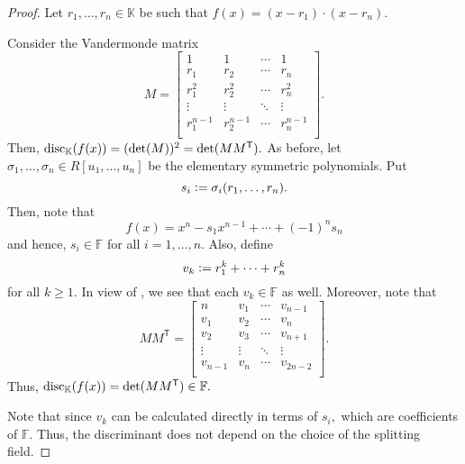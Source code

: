 \independencediscriminant*\label{prop:independencediscriminant2}
\begin{flushright}\hyperref[prop:independencediscriminant]{\upsym}\end{flushright}
\begin{proof}
    Let $r_1, \ldots, r_n \in \mathbb{K}$ be such that $f(x) = (x - r_1) \cdot (x - r_n).$

    Consider the Vandermonde matrix
    \begin{equation*} 
        M = \begin{bmatrix}
            1 & 1 & \cdots & 1\\
            r_1 & r_2 & \cdots & r_n\\
            r_1^2 & r_2^2 & \cdots & r_n^2\\
            \vdots & \vdots & \ddots & \vdots \\
            r_1^{n - 1} & r_2^{n - 1} & \cdots & r_n^{n - 1}\\
        \end{bmatrix}.
    \end{equation*}
    Then, $\operatorname{disc}_{\mathbb{K}}(f(x)) = (\det(M))^2 = \det(MM^{\mathsf{T}}).$ As before, let $\sigma_1, \ldots, \sigma_n \in R[u_1, \ldots, u_n]$ be the elementary symmetric polynomials. Put
    \begin{equation*} 
        s_i \vcentcolon= \sigma_i(r_1, \ldots, r_n).
    \end{equation*}
    Then, note that
    \begin{equation*} 
        f(x) = x^n - s_1x^{n - 1} + \cdots + (-1)^ns_n
    \end{equation*}
    and hence, $s_i \in \mathbb{F}$ for all $i = 1, \ldots, n.$ Also, define
    \begin{equation*} 
        v_k \vcentcolon= r_1^k + \cdots + r_n^k
    \end{equation*}
    for all $k \ge 1.$ In view of , we see that each $v_k \in \mathbb{F}$ as well. Moreover, note that
    \begin{equation*} 
        MM^{\mathsf{T}} = \begin{bmatrix}
            n & v_1 & \cdots & v_{n - 1}\\
            v_1 & v_2 & \cdots & v_n\\
            v_2 & v_3 & \cdots & v_{n + 1}\\
            \vdots & \vdots & \ddots & \vdots \\
            v_{n - 1} & v_n & \cdots & v_{2n - 2}\\
        \end{bmatrix}.
    \end{equation*} 
    Thus, $\operatorname{disc}_{\mathbb{K}}(f(x)) = \det(MM^{\mathsf{T}}) \in \mathbb{F}.$

    Note that since $v_k$ can be calculated directly in terms of $s_i,$ which are coefficients of $\mathbb{F}.$ Thus, the discriminant does not depend on the choice of the splitting field.
\end{proof}

